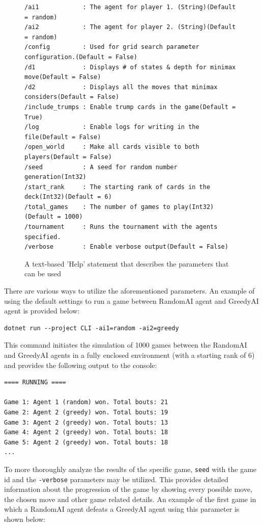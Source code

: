 \begin{figure}[h]
\captionsetup{justification=centering}
\begin{lstlisting}[frame=single]
/ai1            : The agent for player 1. (String)(Default = random)
/ai2            : The agent for player 2. (String)(Default = random)
/config         : Used for grid search parameter configuration.(Default = False)
/d1             : Displays # of states & depth for minimax move(Default = False)
/d2             : Displays all the moves that minimax considers(Default = False)
/include_trumps : Enable trump cards in the game(Default = True)
/log            : Enable logs for writing in the file(Default = False)
/open_world     : Make all cards visible to both players(Default = False)
/seed           : A seed for random number generation(Int32)
/start_rank     : The starting rank of cards in the deck(Int32)(Default = 6)
/total_games    : The number of games to play(Int32)(Default = 1000)
/tournament     : Runs the tournament with the agents specified.
/verbose        : Enable verbose output(Default = False)

\end{lstlisting}
\caption{A text-based 'Help' statement that describes the parameters that can be used}
\label{fig:parameters}
\end{figure}

There are various ways to utilize the aforementioned parameters. An example of using the default settings to run a game between RandomAI agent and GreedyAI agent is provided below:

\begin{lstlisting}[frame=single]
dotnet run --project CLI -ai1=random -ai2=greedy
\end{lstlisting}

This command initiates the simulation of 1000 games between the RandomAI and GreedyAI agents in a fully enclosed environment (with a starting rank of 6) and provides the following output to the console:

\begin{lstlisting}[frame=single]
==== RUNNING ====

Game 1: Agent 1 (random) won. Total bouts: 21
Game 2: Agent 2 (greedy) won. Total bouts: 19
Game 3: Agent 2 (greedy) won. Total bouts: 13
Game 4: Agent 2 (greedy) won. Total bouts: 18
Game 5: Agent 2 (greedy) won. Total bouts: 18
...
\end{lstlisting}

To more thoroughly analyze the results of the specific game, \texttt{seed} with the game id and the \texttt{-verbose}  parameters may be utilized. This provides detailed information about the progression of the game by showing every possible move, the chosen move and other game related details. An example of the first game in which a RandomAI agent defeats a GreedyAI agent using this parameter is shown below:



